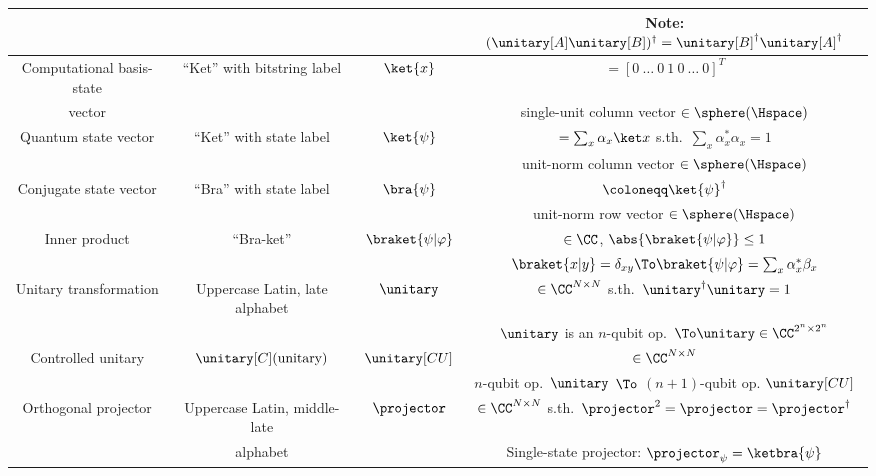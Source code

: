 \begin{table}
{\begin{tabular}{cccc}
        &&& Note: $(\unitary[A]\unitary[B])^\dagger = \unitary[B]^\dagger \unitary[A]^\dagger$ \\
        \midrule
        Computational basis-state & ``Ket'' with bitstring label & $\ket{x}$ & 
        $= [0\ \ldots\ 0\ 1\ 0\ \ldots\ 0]^T$ \\
        vector &&& single-unit column vector $\in\sphere(\Hspace)$\\
        Quantum state vector & ``Ket'' with state label & $\ket{\psi}$ & 
        $= \sum_x \alpha_x \ket x$ s.th.\ $\sum_x \alpha^*_x \alpha_x = 1$ \\
        &&& unit-norm column vector $\in \sphere(\Hspace)$ \\
        Conjugate state vector & ``Bra'' with state label & $\bra{\psi}$ & 
        $\coloneqq \ket{\psi}^\dagger$ \\
        &&& unit-norm row vector $\in \sphere(\Hspace)$  \\
        Inner product & ``Bra-ket'' & $\braket{\psi|\varphi}$ & $\in \CC$, $\abs{\braket{\psi|\varphi}} \leq 1$ \\
        &&& $\braket{x|y} = \delta_{xy} \To \braket{\psi|\varphi} = \sum_x \alpha_x^* \beta_x$ \\
        \midrule
        Unitary transformation & Uppercase Latin, late alphabet & $\unitary$ &
          $\in \CC^{N \times N}$ s.th.\ $\unitary^\dagger \unitary = 1$ \\
        &&& $\unitary$ is an $n$-qubit op.\ $\To \unitary \in \CC^{2^n \times 2^n}$ \\
        Controlled unitary & $\unitary[C]\text{(unitary)}$ & $\unitary[CU]$ &
          $\in \CC^{N \times N}$ \\
        &&& $n$-qubit op.\ $\unitary$ $\To$ $(n+1)$-qubit op. $\unitary[CU]$ \\
        \midrule
        Orthogonal projector & Uppercase Latin, middle-late & $\projector$ & 
          $\in \CC^{N \times N}$ s.th.\ $\projector^2 = \projector = \projector^\dagger$ \\
        & alphabet && Single-state projector: $\projector_\psi = \ketbra{\psi}$ \\

\end{tabular}}
\end{table}
